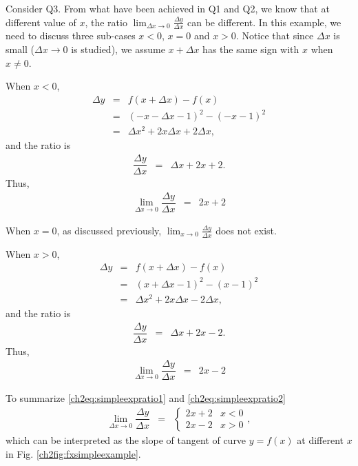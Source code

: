 Consider Q3. From what have been achieved in Q1 and Q2, we know that at different value of $x$, the ratio $\lim_{\Delta x\rightarrow 0}\frac{\Delta y}{\Delta x}$ can be different. In this example, we need to discuss three sub-cases $x<0$, $x=0$ and $x>0$. Notice that since $\Delta x$ is small ($\Delta x \rightarrow 0$ is studied), we assume $x + \Delta x$ has the same sign with $x$ when $x\neq 0$.

When $x<0$,
\begin{eqnarray}
  \Delta y &=& f\left(x + \Delta x\right) - f(x) \nonumber \\
   &=& \left(-x - \Delta x - 1\right)^2 - \left(-x - 1\right)^2 \nonumber \\
   &=& \Delta x^2 + 2x\Delta x + 2\Delta x, \nonumber
\end{eqnarray}
and the ratio is
\begin{eqnarray}
  \dfrac{\Delta y}{\Delta x} &=& \Delta x + 2x + 2. \nonumber
\end{eqnarray}
Thus,
\begin{eqnarray}
  \lim_{\Delta x\rightarrow 0} \dfrac{\Delta y}{\Delta x} &=& 2x + 2 \label{ch2eq:simpleexpratio1}
\end{eqnarray}

When $x=0$, as discussed previously, $\lim_{x\rightarrow 0} \frac{\Delta y}{\Delta x}$ does not exist.

When $x>0$,
\begin{eqnarray}
  \Delta y &=& f\left(x + \Delta x\right) - f(x) \nonumber \\
   &=& \left(x + \Delta x - 1\right)^2 - \left(x - 1\right)^2 \nonumber \\
   &=& \Delta x^2 + 2x\Delta x - 2\Delta x, \nonumber
\end{eqnarray}
and the ratio is
\begin{eqnarray}
  \dfrac{\Delta y}{\Delta x} &=& \Delta x + 2x - 2. \nonumber
\end{eqnarray}
Thus,
\begin{eqnarray}
  \lim_{\Delta x\rightarrow 0} \dfrac{\Delta y}{\Delta x} &=& 2x - 2 \label{ch2eq:simpleexpratio2}
\end{eqnarray}

To summarize \eqref{ch2eq:simpleexpratio1} and \eqref{ch2eq:simpleexpratio2}
\begin{eqnarray}
  \lim_{\Delta x\rightarrow 0} \dfrac{\Delta y}{\Delta x} &=& \left\{\begin{array}{cc}
                                                                2x + 2 & x < 0 \\
                                                                2x - 2 & x > 0
                                                              \end{array}\right., \label{ch2eq:simpleexpgeneralratio}
\end{eqnarray}
which can be interpreted as the slope of tangent of curve $y=f(x)$ at different $x$ in Fig. \ref{ch2fig:fxsimpleexample}.


